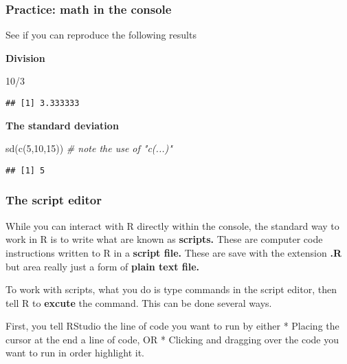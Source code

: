\documentclass[
]{book}
\newenvironment{Shaded}{\begin{snugshade}}{\end{snugshade}}
\newcommand{\CommentTok}[1]{\textcolor[rgb]{0.56,0.35,0.01}{\textit{#1}}}
\newcommand{\DecValTok}[1]{\textcolor[rgb]{0.00,0.00,0.81}{#1}}
\newcommand{\FunctionTok}[1]{\textcolor[rgb]{0.00,0.00,0.00}{#1}}
\newcommand{\NormalTok}[1]{#1}
\newcommand{\SpecialCharTok}[1]{\textcolor[rgb]{0.00,0.00,0.00}{#1}}
\begin{document}
\hypertarget{practice-math-in-the-console}{%
\subsubsection{Practice: math in the console}\label{practice-math-in-the-console}}

See if you can reproduce the following results

\textbf{Division}

\begin{Shaded}
\begin{Highlighting}[]
\DecValTok{10}\SpecialCharTok{/}\DecValTok{3}
\end{Highlighting}
\end{Shaded}

\begin{verbatim}
## [1] 3.333333
\end{verbatim}

\textbf{The standard deviation}

\begin{Shaded}
\begin{Highlighting}[]
\FunctionTok{sd}\NormalTok{(}\FunctionTok{c}\NormalTok{(}\DecValTok{5}\NormalTok{,}\DecValTok{10}\NormalTok{,}\DecValTok{15}\NormalTok{)) }\CommentTok{\# note the use of "c(...)"}
\end{Highlighting}
\end{Shaded}

\begin{verbatim}
## [1] 5
\end{verbatim}

\hypertarget{the-script-editor}{%
\subsubsection{The script editor}\label{the-script-editor}}

While you can interact with R directly within the console, the standard way to work in R is to write what are known as \textbf{scripts.} These are computer code instructions written to R in a \textbf{script file.} These are save with the extension \textbf{.R} but area really just a form of \textbf{plain text file.}

To work with scripts, what you do is type commands in the script editor, then tell R to \textbf{excute} the command. This can be done several ways.

First, you tell RStudio the line of code you want to run by either
* Placing the cursor at the end a line of code, OR
* Clicking and dragging over the code you want to run in order highlight it.
\end{document}
